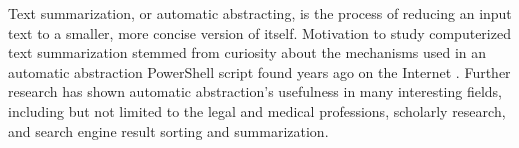 Text summarization, or automatic abstracting, is the process of reducing an input text to a smaller, more concise version of itself. Motivation to study computerized text summarization stemmed from curiosity about the mechanisms used in an automatic abstraction PowerShell script found years ago on the Internet \cite{PSScript}. Further research has shown automatic abstraction's usefulness in many interesting fields, including but not limited to the legal and medical professions, scholarly research, and search engine result sorting and summarization.
